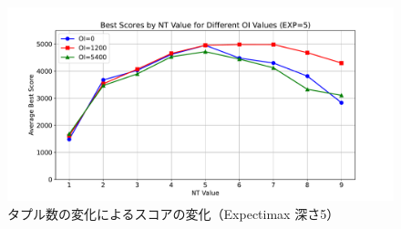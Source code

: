 \begin{figure}[t]
    \centering
    \includegraphics[width=\linewidth]{pdf/best_tn_scores_exp5.pdf}
    \caption{タプル数の変化によるスコアの変化（Expectimax 深さ5）}
    \label{fig:score_vs_tuple_exp5}
\end{figure}

